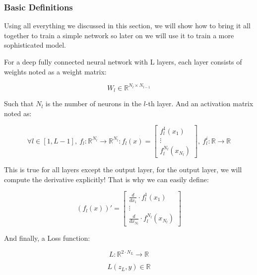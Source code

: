 \subsubsection*{Basic Definitions}

Using all everything we discussed in this section, we will show how to bring it all together to train a simple network so later on we will use it to train a more sophisticated model.

For a deep fully connected neural network with L layers, each layer consists of weights noted as a weight matrix:

\begin{equation} \label{eq:weight_l}
    W_l \in \mathbb{R}^{N_l \times N_{l-1}}
\end{equation}

Such that \( N_l \) is the number of neurons in the \(l\)-th layer.
And an activation matrix noted as:

\begin{equation} \label{eq:activation_def}
    \forall l \in [1, L-1], \ f_l: \mathbb{R}^{N_l} \to \mathbb{R}^{N_l} \colon f_l (x) = \begin{bmatrix} f_l^1(x_1) \\ \vdots \\ f_l^{N_l}(x_{N_l}) \end{bmatrix}, \ f_l^i : \mathbb{R} \to \mathbb{R}
\end{equation}

This is true for all layers except the output layer, for the output layer, we will compute the derivative explicitly!
That is why we can easily define:

\begin{equation} \label{eq:col_der}
    (f_l (x))' = \begin{bmatrix} \frac{d}{dx_1} \cdot f_l^1(x_1) \\ \vdots \\ \frac{d}{dx_{N_l}} \cdot f_l^{N_l}(x_{N_l}) \end{bmatrix}
\end{equation}

And finally, a Loss function:

\begin{equation}
    L: \mathbb{R}^{2 \cdot N_L} \to \mathbb{R}
\end{equation}

\begin{equation}
    L(z_L, y) \in \mathbb{R}
\end{equation}

